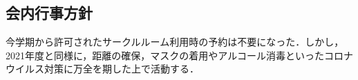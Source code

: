 \subsection*{会内行事方針}


今学期から許可されたサークルルーム利用時の予約は不要になった．しかし，2021年度と同様に，距離の確保，マスクの着用やアルコール消毒といったコロナウイルス対策に万全を期した上で活動する．
